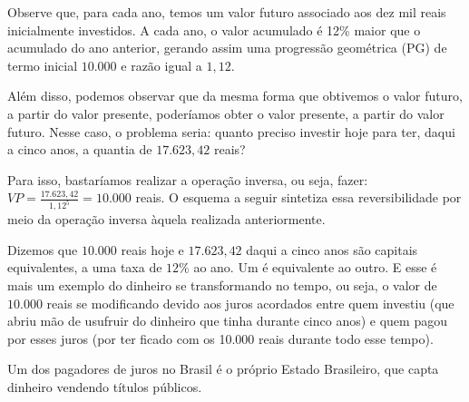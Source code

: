 Observe que, para cada ano, temos um valor futuro associado aos dez mil reais inicialmente investidos. A cada ano, o valor acumulado é 12\% maior que o acumulado do ano anterior, gerando assim uma progressão geométrica (PG) de termo inicial $10.000$ e razão igual a $1{,}12$.

Além disso, podemos observar que da mesma forma que obtivemos o valor futuro, a partir do valor presente, poderíamos obter o valor presente, a partir do valor futuro. Nesse caso, o problema seria: quanto preciso investir hoje para ter, daqui a cinco anos, a quantia de $17.623{,}42$ reais?

Para isso, bastaríamos realizar a operação inversa, ou seja, fazer: ${\displaystyle \mathit{VP} = \frac{ 17.623{,}42}{ 1{,}12^5} = 10.000}${} reais. O esquema a seguir sintetiza essa reversibilidade por meio da operação inversa àquela realizada anteriormente.


\begin{figure}[H]
\centering


\end{figure}

Dizemos que $10.000$ reais hoje e $17.623{,}42$ daqui a cinco anos são capitais equivalentes, a uma taxa de $12\%$ ao ano. Um é equivalente ao outro. E esse é mais um exemplo do dinheiro se transformando no tempo, ou seja, o valor de $10.000$ reais se modificando devido aos juros acordados entre quem investiu (que abriu mão de usufruir do dinheiro que tinha durante cinco anos) e quem pagou por esses juros (por ter ficado com os 10.000 reais durante todo esse tempo). 

Um dos pagadores de juros no Brasil é o próprio Estado Brasileiro, que capta dinheiro vendendo títulos públicos.

